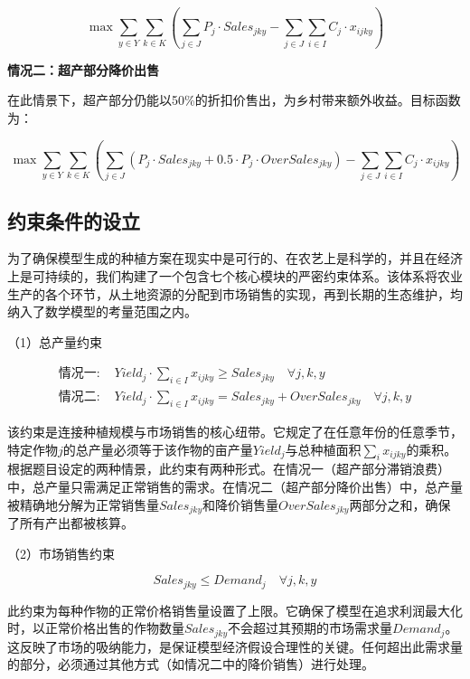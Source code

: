 \documentclass[withoutpreface,bwprint]{cumcmthesis} %
\begin{document}
\begin{equation}
	\max \sum_{y \in Y} \sum_{k \in K} \left( \sum_{j \in J} P_j \cdot Sales_{jky} - \sum_{j \in J} \sum_{i \in I} C_j \cdot x_{ijky} \right)
\end{equation}

\textbf{情况二：超产部分降价出售}

在此情景下，超产部分仍能以50\%的折扣价售出，为乡村带来额外收益。目标函数为：

\begin{equation}
	\max \sum_{y \in Y} \sum_{k \in K} \left( \sum_{j \in J} (P_j \cdot Sales_{jky} + 0.5 \cdot P_j \cdot OverSales_{jky}) - \sum_{j \in J} \sum_{i \in I} C_j \cdot x_{ijky} \right)
\end{equation}

\subsection{约束条件的设立}

为了确保模型生成的种植方案在现实中是可行的、在农艺上是科学的，并且在经济上是可持续的，我们构建了一个包含七个核心模块的严密约束体系。该体系将农业生产的各个环节，从土地资源的分配到市场销售的实现，再到长期的生态维护，均纳入了数学模型的考量范围之内。

（1）总产量约束


\begin{align}
	\text{情况一: } & Yield_j \cdot \sum_{i \in I} x_{ijky} \ge Sales_{jky} \quad \forall j, k, y                 \\
	\text{情况二: } & Yield_j \cdot \sum_{i \in I} x_{ijky} = Sales_{jky} + OverSales_{jky} \quad \forall j, k, y
\end{align}


该约束是连接种植规模与市场销售的核心纽带。它规定了在任意年份的任意季节，特定作物$j$的总产量必须等于该作物的亩产量$Yield_j$与总种植面积$\sum_{i} x_{ijky}$的乘积。根据题目设定的两种情景，此约束有两种形式。在情况一（超产部分滞销浪费）中，总产量只需满足正常销售的需求。在情况二（超产部分降价出售）中，总产量被精确地分解为正常销售量$Sales_{jky}$和降价销售量$OverSales_{jky}$两部分之和，确保了所有产出都被核算。

（2）市场销售约束

\begin{equation}
	Sales_{jky} \le Demand_j \quad \forall j, k, y
\end{equation}

此约束为每种作物的正常价格销售量设置了上限。它确保了模型在追求利润最大化时，以正常价格出售的作物数量$Sales_{jky}$不会超过其预期的市场需求量$Demand_j$。这反映了市场的吸纳能力，是保证模型经济假设合理性的关键。任何超出此需求量的部分，必须通过其他方式（如情况二中的降价销售）进行处理。
\end{document}
